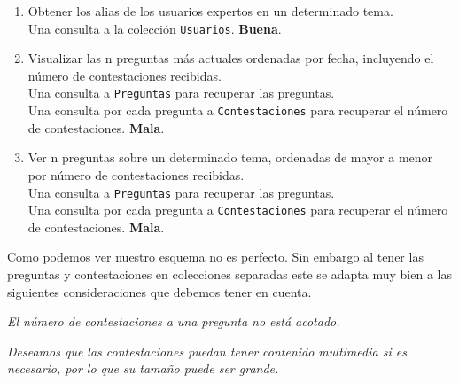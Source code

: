\documentclass{article}
\begin{document}
\begin{enumerate}
      \item Obtener los alias de los usuarios expertos en un determinado tema.\\
        Una consulta a la colección \texttt{Usuarios}. \textbf{Buena}.
      \item Visualizar las n preguntas más actuales ordenadas por fecha, incluyendo
        el número de contestaciones recibidas.\\ 
        Una consulta a \texttt{Preguntas} para recuperar las preguntas. \\
        Una consulta por cada pregunta a \texttt{Contestaciones} para recuperar
        el número de contestaciones. \textbf{Mala}.
      \item Ver n preguntas sobre un determinado tema, ordenadas de mayor a menor
        por número de contestaciones recibidas.\\
        Una consulta a \texttt{Preguntas} para recuperar las preguntas. \\
        Una consulta por cada pregunta a \texttt{Contestaciones} para recuperar
        el número de contestaciones. \textbf{Mala}.
    \end{enumerate}
    Como podemos ver nuestro esquema no es perfecto. Sin embargo al tener las
    preguntas y contestaciones en colecciones separadas este se adapta muy bien
    a las siguientes consideraciones que debemos tener en cuenta.
    \\ \par
    \emph{
      El número de contestaciones a una pregunta no está acotado.
    }
    \\ \par
    \emph{
      Deseamos que las contestaciones puedan tener contenido multimedia si es
      necesario, por lo que su tamaño puede ser grande.
    }

    
\end{document}

